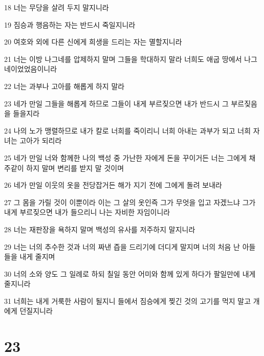 \par 18 너는 무당을 살려 두지 말지니라
\par 19 짐승과 행음하는 자는 반드시 죽일지니라
\par 20 여호와 외에 다른 신에게 희생을 드리는 자는 멸할지니라
\par 21 너는 이방 나그네를 압제하지 말며 그들을 학대하지 말라 너희도 애굽 땅에서 나그네이었었음이니라
\par 22 너는 과부나 고아를 해롭게 하지 말라
\par 23 네가 만일 그들을 해롭게 하므로 그들이 내게 부르짖으면 내가 반드시 그 부르짖음을 들을지라
\par 24 나의 노가 맹렬하므로 내가 칼로 너희를 죽이리니 너희 아내는 과부가 되고 너희 자녀는 고아가 되리라
\par 25 네가 만일 너와 함께한 나의 백성 중 가난한 자에게 돈을 꾸이거든 너는 그에게 채주같이 하지 말며 변리를 받지 말 것이며
\par 26 네가 만일 이웃의 옷을 전당잡거든 해가 지기 전에 그에게 돌려 보내라
\par 27 그 몸을 가릴 것이 이뿐이라 이는 그 살의 옷인즉 그가 무엇을 입고 자겠느냐 그가 내게 부르짖으면 내가 들으리니 나는 자비한 자임이니라
\par 28 너는 재판장을 욕하지 말며 백성의 유사를 저주하지 말지니라
\par 29 너는 너의 추수한 것과 너의 짜낸 즙을 드리기에 더디게 말지며 너의 처음 난 아들들을 내게 줄지며
\par 30 너의 소와 양도 그 일례로 하되 칠일 동안 어미와 함께 있게 하다가 팔일만에 내게 줄지니라
\par 31 너희는 내게 거룩한 사람이 될지니 들에서 짐승에게 찢긴 것의 고기를 먹지 말고 개에게 던질지니라

\chapter{23}

